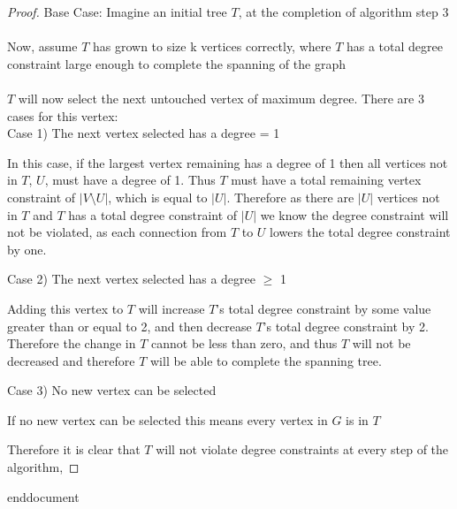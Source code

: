 \documentclass{article}
\begin{document}
\begin{proof}
Base Case: Imagine an initial tree $T$, at the completion of algorithm step 3
\\
\\
Now, assume $T$ has grown to size k vertices correctly, where $T$ has a total degree constraint large enough to complete the spanning of the graph
\\\\
$T$ will now select the next untouched vertex of maximum degree. There are 3 cases for this vertex:
\\

    \setlength\parindent{12pt} 
    Case 1) The next vertex selected has a degree = 1 \par
        \setlength\parindent{24pt}\hangindent=24pt 
        In this case, if the largest vertex remaining has a degree of 1 then all vertices not in $T$, $U$, must
        have a degree of 1. Thus $T$ must have a total remaining vertex constraint of $|V \setminus U|$, which is equal to  $|U|$. Therefore as there are $|U|$ vertices not in $T$ and $T$ has a total degree constraint of $|U|$ we know the degree constraint will not be violated, as each connection from $T$ to $U$ lowers the total degree constraint by one.
        \par
        
    \setlength\parindent{12pt}
    Case 2) The next vertex selected has a degree $\geq$ 1\par
        \setlength\parindent{24pt}\hangindent=24pt 
        Adding this vertex to $T$ will increase $T$'s total degree constraint by some value greater than or equal to 2, and then decrease $T$'s total degree constraint by 2.
        Therefore the change in $T$ cannot be less than zero, and thus $T$ will not be decreased and therefore $T$ will be able to complete the spanning tree.
        \par

    \setlength\parindent{12pt}
    Case 3) No new vertex can be selected\par
        \setlength\parindent{24pt}\hangindent=24pt 
        If no new vertex can be selected this means every vertex in $G$ is in $T$
        \par
        
    \setlength\parindent{0pt}\hangindent=0pt
    Therefore it is clear that $T$ will not violate degree constraints at every step of the algorithm,

\end{proof}
end{document}
\end{document}

